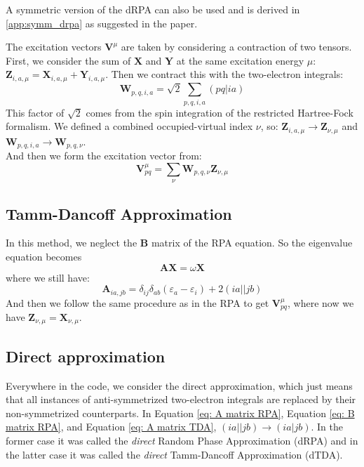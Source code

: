 \documentclass[12pt]{caltech_thesis}
\begin{document}
A symmetric version of the dRPA can also be used and is derived in \ref{app:symm_drpa} as suggested in the paper.

The excitation vectors $\textbf{V}^{\mu}$ are taken by considering a contraction of two tensors. First, we consider the sum of $\textbf{X}$ and $\textbf{Y}$ at the same excitation energy $\mu$: $\textbf{Z}_{i,a,\mu} = \textbf{X}_{i,a,\mu} + \textbf{Y}_{i,a,\mu}$. Then we contract this with the two-electron integrals:
\begin{equation}
    \textbf{W}_{p,q,i,a} = \sqrt{2} \sum_{p,q,i,a} (pq|ia)
\end{equation}
This factor of $\sqrt{2}$ comes from the spin integration of the restricted Hartree-Fock formalism.
We defined a combined occupied-virtual index $\nu$, so: $\textbf{Z}_{i,a,\mu} \rightarrow \textbf{Z}_{\nu, \mu}$ and $\textbf{W}_{p,q,i,a}\rightarrow \textbf{W}_{p,q,\nu}$.\\

And then we form the excitation vector from:
\begin{equation}
    \textbf{V}_{pq}^{\mu} = \sum_{\nu} \textbf{W}_{p,q,\nu}\textbf{Z}_{\nu, \mu}
\end{equation}

\subsection{Tamm-Dancoff Approximation}
In this method, we neglect the $\textbf{B}$ matrix of the RPA equation. So the eigenvalue equation becomes
\begin{equation}
    \textbf{A}\textbf{X} = \omega \textbf{X}
\end{equation}
where we still have:
\begin{equation}
    \textbf{A}_{ia,jb} = \delta _{ij}\delta _{ab}(\varepsilon _{a}- \varepsilon _{i}) + 2(ia||jb)
\label{eq: A matrix TDA}
\end{equation}
And then we follow the same procedure as in the RPA to get $\textbf{V}_{pq}^{\mu}$, where now we have $\textbf{Z}_{\nu, \mu} = \textbf{X}_{\nu, \mu}$.
\subsection{Direct approximation}
Everywhere in the code, we consider the direct approximation, which just means that all instances of anti-symmetrized two-electron integrals are replaced by their non-symmetrized counterparts. In Equation \ref{eq: A matrix RPA}, Equation \ref{eq: B matrix RPA}, and Equation \ref{eq: A matrix TDA}, $(ia||jb) \rightarrow (ia|jb)$. In the former case it was called the \emph{direct} Random Phase Approximation (dRPA) and in the latter case it was called the \emph{direct} Tamm-Dancoff Approximation (dTDA).
\end{document}
